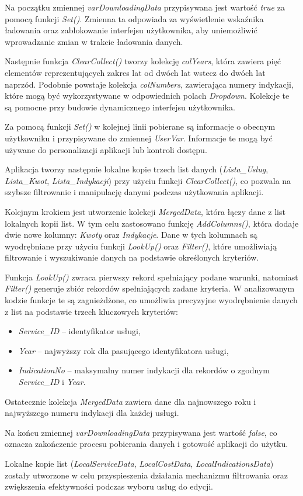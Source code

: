  Na początku zmiennej \emph{varDownloadingData} przypisywana jest wartość \emph{true} za pomocą funkcji \emph{Set()}. Zmienna ta odpowiada za wyświetlenie wskaźnika ładowania oraz zablokowanie interfejsu użytkownika, aby uniemożliwić wprowadzanie zmian w trakcie ładowania danych.

Następnie funkcja \emph{ClearCollect()} tworzy kolekcję \emph{colYears}, która zawiera pięć elementów reprezentujących zakres lat od dwóch lat wstecz do dwóch lat naprzód. Podobnie powstaje kolekcja \emph{colNumbers}, zawierająca numery indykacji, które mogą być wykorzystywane w odpowiednich polach \emph{Dropdown}. Kolekcje te są pomocne przy budowie dynamicznego interfejsu użytkownika.

Za pomocą funkcji \emph{Set()} w kolejnej linii pobierane są informacje o obecnym użytkowniku i przypisywane do zmiennej \emph{UserVar}. Informacje te mogą być używane do personalizacji aplikacji lub kontroli dostępu.

Aplikacja tworzy następnie lokalne kopie trzech list danych (\emph{Lista\_Uslug}, \emph{Lista\_Kwot}, \emph{Lista\_Indykacji}) przy użyciu funkcji \emph{ClearCollect()}, co pozwala na szybsze filtrowanie i manipulację danymi podczas użytkowania aplikacji.

Kolejnym krokiem jest utworzenie kolekcji \emph{MergedData}, która łączy dane z list lokalnych kopii list. W tym celu zastosowano funkcję \emph{AddColumns()}, która dodaje dwie nowe kolumny: \emph{Kwoty} oraz \emph{Indykacje}. Dane w tych kolumnach są wyodrębniane przy użyciu funkcji \emph{LookUp()} oraz \emph{Filter()}, które umożliwiają filtrowanie i wyszukiwanie danych na podstawie określonych kryteriów.

Funkcja \emph{LookUp()} zwraca pierwszy rekord spełniający podane warunki, natomiast \emph{Filter()} generuje zbiór rekordów spełniających zadane kryteria. W analizowanym kodzie funkcje te są zagnieżdżone, co umożliwia precyzyjne wyodrębnienie danych z list na podstawie trzech kluczowych kryteriów:
\begin{itemize}
    \item \emph{Service\_ID} – identyfikator usługi,
    \item \emph{Year} – najwyższy rok dla pasującego identyfikatora usługi,
    \item \emph{IndicationNo} – maksymalny numer indykacji dla rekordów o zgodnym \emph{Service\_ID} i \emph{Year}.
\end{itemize}

Ostatecznie kolekcja \emph{MergedData} zawiera dane dla najnowszego roku i najwyższego numeru indykacji dla każdej usługi.

Na końcu zmiennej \emph{varDownloadingData} przypisywana jest wartość \emph{false}, co oznacza zakończenie procesu pobierania danych i gotowość aplikacji do użytku.

Lokalne kopie list (\emph{LocalServiceData}, \emph{LocalCostData}, \emph{LocalIndicationsData}) zostały utworzone w celu przyspieszenia działania mechanizmu filtrowania oraz zwiększenia efektywności podczas wyboru usług do edycji.




